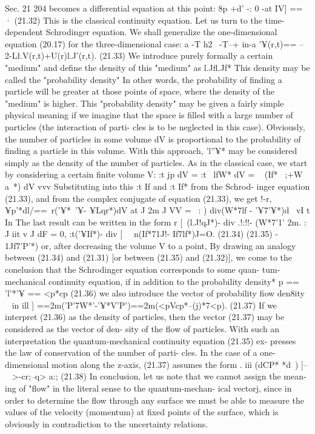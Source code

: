\documentclass[a4paper,sfsidenotes,colorlinks=true]{tufte-book}
\numberwithin{equation}{section}
\numberwithin{figure}{section}
\begin{document}
{{{{Sec. 21
204
becomes a differential equation at this point: 8p +d' -: 0
-at	IV] == ·	(21.32)
This is the classical continuity equation. Let us turn to the time-dependent Schrodinger equation. We shall generalize the one-dimensional equation (20.17) for the three-dimensional case:
a
-T h2~ -T--+ in-a '¥(r,t)== --2-L\l.V(r,t)+U(r)l.J'(r,t).	(21.33)
We introduce purely formally a certain "medium" and define the density of this "medium" as l.Jfl.Jf* This density may be called the "probability density" In other words, the probability of finding a particle will be greater at those points of space, where the density of the "medium" is higher.
This "probability density" may be given a fairly simple physical meaning if we imagine that the space is filled with a large number of particles (the interaction of parti- cles is to be neglected in this case). Obviously, the number of particles in some volume dV is proportional to the probability of finding a particle in this volume. With this approach, 'l''¥* may be considered simply as the density of the number of particles.
As in the classical case, we start by considering a certain finite volume V:
:t jp dV = :t ~lfW* dV = ~ (If* ~;+W a~*) dV vvv
Substituting	into	this	:t If	and	:t If*	from	the	Schrod- inger equation (21.33), and from the complex conjugate
of equation (21.33), we get
!-r,¥p'*dl/==~r('¥*~'¥- ¥Lqr*)dV at J	2m J
VV
=	~: )	div(W*7lf -	'¥7'¥*)d~ vI
t In
The last result can be written in the form r [~(l.J!qJ*)-	div	{.!:!!- (W*7'1'
2m.
:
J iit v
J
dF = 0, :t('¥If*)- div [ ~~n(If*71J!- If7lf*)J=O.
(21.34) (21.35)
-	1Jf7'P'*) } or, after decreasing the volume V to a point,
By drawing an analogy between (21.34) and (21.31) [or between (21.35) and (21.32)], we come to the conelusion that the Schrodinger equation corresponds to some quan- tum-mechanical continuity equation, if in addition to the probability density*
p == 'l'*'¥ == <p*cp	(21.36) we also introduce the vector of probability fiow den8ity
~ in	ill ] ==2m('P'7W*'-'¥*V'P')==2m(<pVcp*--(j)*7<p).	(21.37)
If we interpret (21.36) as the density of particles, then the vector (21.37) may be considered as the vector of den- sity of the flow of particles. With such an interpretation the quantum-mechanical continuity equation (21.35) ex- presses the law of conservation of the number of parti- cles.
In the case of a one-dimensional motion along the z-axis, (21.37) assumes the form
. iii (dCP*	*d~) ]--~ >-cr;--q> a:;
(21.38)
In conclusion, let us note that we cannot assign the mean- ing of "flow" in the literal sense to the quantum-mechan-
ical vectorj, since in order to determine the flow through any surface we must be able to measure the values of the velocity (momentum) at fixed points of the surface, which is obviously in contradiction to the uncertainty relations.
}}}}
\end{document}
